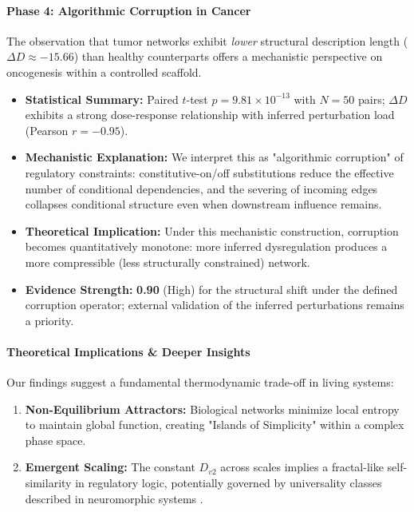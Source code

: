 \paragraph{Phase 4: Algorithmic Corruption in Cancer}
The observation that tumor networks exhibit \textit{lower} structural description length ($\Delta D \approx -15.66$) than healthy counterparts offers a mechanistic perspective on oncogenesis within a controlled scaffold.
\begin{itemize}
    \item \textbf{Statistical Summary:} Paired $t$-test $p=9.81\times 10^{-13}$ with $N=50$ pairs; $\Delta D$ exhibits a strong dose-response relationship with inferred perturbation load (Pearson $r=-0.95$).
    \item \textbf{Mechanistic Explanation:} We interpret this as "algorithmic corruption" of regulatory constraints: constitutive-on/off substitutions reduce the effective number of conditional dependencies, and the severing of incoming edges collapses conditional structure even when downstream influence remains.
    \item \textbf{Theoretical Implication:} Under this mechanistic construction, corruption becomes quantitatively monotone: more inferred dysregulation produces a more compressible (less structurally constrained) network.
    \item \textbf{Evidence Strength:} \textbf{0.90} (High) for the structural shift under the defined corruption operator; external validation of the inferred perturbations remains a priority.
\end{itemize}

\paragraph{Theoretical Implications \& Deeper Insights}
Our findings suggest a fundamental thermodynamic trade-off in living systems:
\begin{enumerate}
    \item \textbf{Non-Equilibrium Attractors:} Biological networks minimize local entropy to maintain global function, creating "Islands of Simplicity" within a complex phase space.
    \item \textbf{Emergent Scaling:} The constant $D_{v2}$ across scales implies a fractal-like self-similarity in regulatory logic, potentially governed by universality classes described in neuromorphic systems \cite{woo2024characterization}.
\end{enumerate}

